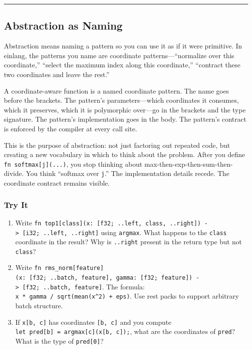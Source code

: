 \documentclass[11pt,]{article}
\begin{document}
\begin{center}\rule{0.5\linewidth}{0.4pt}\end{center}

\hypertarget{abstraction-as-naming}{%
\subsection{Abstraction as Naming}\label{abstraction-as-naming}}

Abstraction means naming a pattern so you can use it as if it were
primitive. In einlang, the patterns you name are coordinate
patterns---``normalize over this coordinate,'' ``select the maximum
index along this coordinate,'' ``contract these two coordinates and
leave the rest.''

A coordinate-aware function is a named coordinate pattern. The name goes
before the brackets. The pattern's parameters---which coordinates it
consumes, which it preserves, which it is polymorphic over---go in the
brackets and the type signature. The pattern's implementation goes in
the body. The pattern's contract is enforced by the compiler at every
call site.

This is the purpose of abstraction: not just factoring out repeated
code, but creating a new vocabulary in which to think about the problem.
After you define \texttt{fn\ softmax{[}j{]}(...)}, you stop thinking
about max-then-exp-then-sum-then-divide. You think ``softmax over
\texttt{j}.'' The implementation details recede. The coordinate contract
remains visible.

\hypertarget{try-it-9}{%
\subsubsection{Try It}\label{try-it-9}}

\begin{enumerate}
\def\labelenumi{\arabic{enumi}.}
\item
  Write
  \texttt{fn\ top1{[}class{]}(x:\ {[}f32;\ ..left,\ class,\ ..right{]})\ -\textgreater{}\ {[}i32;\ ..left,\ ..right{]}}
  using \texttt{argmax}. What happens to the \texttt{class} coordinate
  in the result? Why is \texttt{..right} present in the return type but
  not \texttt{class}?
\item
  Write
  \texttt{fn\ rms\_norm{[}feature{]}(x:\ {[}f32;\ ..batch,\ feature{]},\ gamma:\ {[}f32;\ feature{]})\ -\textgreater{}\ {[}f32;\ ..batch,\ feature{]}}.
  The formula: \texttt{x\ *\ gamma\ /\ sqrt(mean(x\^{}2)\ +\ eps)}. Use
  rest packs to support arbitrary batch structure.
\item
  If \texttt{x{[}b,\ c{]}} has coordinates \texttt{{[}b,\ c{]}} and you
  compute \texttt{let\ pred{[}b{]}\ =\ argmax{[}c{]}(x{[}b,\ c{]});},
  what are the coordinates of \texttt{pred}? What is the type of
  \texttt{pred{[}0{]}}?
\end{enumerate}
\end{document}
